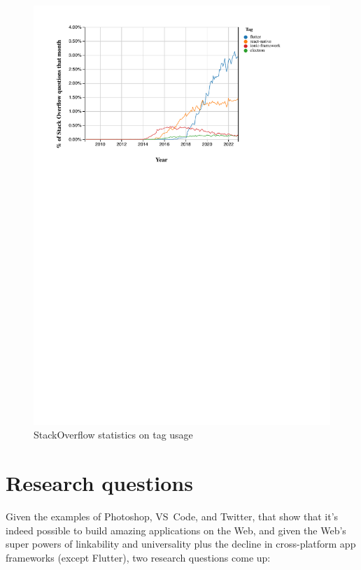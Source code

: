 \documentclass[sigconf]{acmart}
\begin{document}
\begin{figure}[H]
    \centering
    \includegraphics[clip, trim=1.5cm 18.2cm 3.5cm 1.25cm, width=\columnwidth]{stackoverflow.pdf}
    \caption{StackOverflow statistics on tag usage}
    \label{fig:stackoverflow}
\end{figure}

\section{Research questions}

Given the examples of Photoshop, VS~Code, and Twitter, that show that it's indeed possible to build amazing applications on the Web, and given the Web's super powers of linkability and universality plus the decline in cross-platform app frameworks (except Flutter), two research questions come up:
\end{document}
